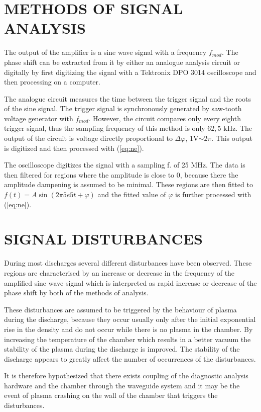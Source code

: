\documentclass[twoside]{articlek}
\begin{document}
\section{METHODS OF SIGNAL ANALYSIS}

The output of the amplifier is a sine wave signal with a frequency $f_{mod}$. The phase shift can be extracted from it by either an analogue analysis circuit or digitally by first digitizing the signal with a Tektronix DPO 3014 oscilloscope and then processing on a computer. 

The analogue circuit measures the time between the trigger signal and the roots of the sine signal. The trigger signal is synchronously generated by saw-tooth voltage generator with $f_{mod}$. However, the circuit compares only every eighth trigger signal, thus the sampling frequency of this method is only $62,5$ kHz. The output of the circuit is voltage directly proportional to $\Delta \varphi $, 1V$\sim 2\pi$. This output is digitized and then processed with (\ref{eq:ne}).

The oscilloscope digitizes the signal with a sampling f. of 25 MHz. The data is then filtered for regions where the amplitude is close to 0, because there the amplitude dampening is assumed to be minimal. These regions are then fitted to $f(t)=A\sin(2 \pi 5e5 t+ \varphi)$ and the fitted value of $\varphi$ is further processed with (\ref{eq:ne}).

\section{SIGNAL DISTURBANCES}

During most discharges several different disturbances have been observed. These regions are characterised by an increase or decrease in the frequency of the amplified sine wave signal which is interpreted as rapid increase or decrease of the phase shift by both of the methods of analysis.

These disturbances are assumed to be triggered by the behaviour of plasma during the discharge, because they occur usually only after the initial exponential rise in the density and do not occur while there is no plasma in the chamber. By increasing the temperature of the chamber which results in a better vacuum the stability of the plasma during the discharge is improved. The stability of the discharge appears to greatly affect the number of occurrences of the disturbances.

It is therefore hypothesized that there exists coupling of the diagnostic analysis hardware and the chamber through the waveguide system and it may be the event of plasma crashing on the wall of the chamber that triggers the disturbances.
\end{document}
